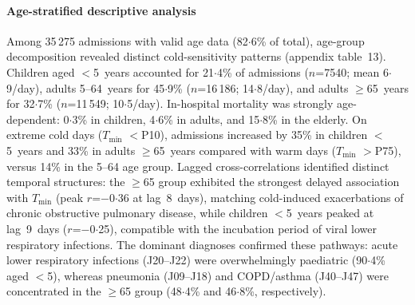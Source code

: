 \documentclass[review,number]{elsarticle}
\begin{document}
\paragraph{Age-stratified descriptive analysis}
Among 35\,275 admissions with valid age data (82${\cdot}$6\% of
total), age-group decomposition revealed distinct cold-sensitivity
patterns (appendix table~13). Children aged $<$5~years
accounted for 21${\cdot}$4\% of admissions ($n$=7540; mean
6${\cdot}$9/day), adults 5--64~years for 45${\cdot}$9\%
($n$=16\,186; 14${\cdot}$8/day), and adults $\geq$65~years for
32${\cdot}$7\% ($n$=11\,549; 10${\cdot}$5/day). In-hospital
mortality was strongly age-dependent: 0${\cdot}$3\% in children,
4${\cdot}$6\% in adults, and 15${\cdot}$8\% in the elderly. On
extreme cold days ($T_\mathrm{min}$ $<$P10), admissions increased
by 35\% in children $<$5~years and 33\% in adults $\geq$65~years
compared with warm days ($T_\mathrm{min}$ $>$P75), versus 14\% in
the 5--64 age group. Lagged cross-correlations identified distinct
temporal structures: the $\geq$65 group exhibited the strongest
delayed association with $T_\mathrm{min}$ (peak $r$=$-$0${\cdot}$36
at lag~8~days), matching cold-induced exacerbations of chronic
obstructive pulmonary disease, while children $<$5~years peaked at
lag~9~days ($r$=$-$0${\cdot}$25), compatible with the incubation
period of viral lower respiratory infections. The dominant diagnoses
confirmed these pathways: acute lower respiratory infections
(J20--J22) were overwhelmingly paediatric (90${\cdot}$4\% aged
$<$5), whereas pneumonia (J09--J18) and COPD/asthma (J40--J47) were
concentrated in the $\geq$65 group (48${\cdot}$4\% and
46${\cdot}$8\%, respectively).
\end{document}
